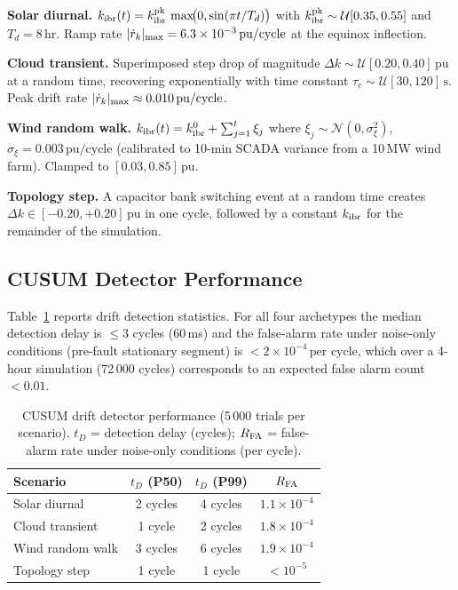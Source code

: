 \documentclass[journal]{IEEEtran}
\newcommand{\kibr}{k_{\rm ibr}}
\newcommand{\rdot}{\dot{r}_k}
\begin{document}
\textbf{Solar diurnal.}
$\kibr(t) = \kibr^{\rm pk}\,\max\!\bigl(0,\sin(\pi t/T_d)\bigr)$ with
$\kibr^{\rm pk} \sim \mathcal{U}[0.35, 0.55]$ and $T_d = 8\,\text{hr}$.
Ramp rate $|\rdot|_{\rm max} = 6.3\times10^{-3}\,\text{pu/cycle}$
at the equinox inflection.

\textbf{Cloud transient.}
Superimposed step drop of magnitude
$\Delta k \sim \mathcal{U}[0.20, 0.40]\,\text{pu}$ at a random time,
recovering exponentially with time constant $\tau_c \sim
\mathcal{U}[30, 120]\,\text{s}$.
Peak drift rate $|\rdot|_{\rm max} \approx 0.010\,\text{pu/cycle}$.

\textbf{Wind random walk.}
$\kibr(t) = \kibr^0 + \sum_{j=1}^{t} \xi_j$ where $\xi_j \sim
\mathcal{N}(0, \sigma_\xi^2)$, $\sigma_\xi = 0.003\,\text{pu/cycle}$
(calibrated to 10-min SCADA variance from a 10\,MW wind farm).
Clamped to $[0.03, 0.85]\,\text{pu}$.

\textbf{Topology step.}
A capacitor bank switching event at a random time creates
$\Delta k \in [-0.20, +0.20]\,\text{pu}$ in one cycle, followed by a
constant $\kibr$ for the remainder of the simulation.

\subsection{CUSUM Detector Performance}

Table~\ref{tab:cusum} reports drift detection statistics.  For all
four archetypes the median detection delay is $\leq 3$ cycles (60\,ms)
and the false-alarm rate under noise-only conditions (pre-fault
stationary segment) is $< 2\times10^{-4}\,\text{per cycle}$, which
over a 4-hour simulation (72\,000 cycles) corresponds to an expected
false alarm count $< 0.01$.

\begin{table}[htbp]
  \centering
  \caption{CUSUM drift detector performance (5\,000 trials per scenario).
  $t_D$ = detection delay (cycles); $R_{\rm FA}$ = false-alarm rate
  under noise-only conditions (per cycle).}
  \label{tab:cusum}
  \small
  \begin{tabular}{@{}lccc@{}}
    \toprule
    Scenario & $t_D$ (P50) & $t_D$ (P99) & $R_{\rm FA}$ \\
    \midrule
    Solar diurnal   & 2 cycles & 4 cycles & $1.1\!\times\!10^{-4}$ \\
    Cloud transient & 1 cycle  & 2 cycles & $1.8\!\times\!10^{-4}$ \\
    Wind random walk & 3 cycles & 6 cycles & $1.9\!\times\!10^{-4}$ \\
    Topology step   & 1 cycle  & 1 cycle  & $< 10^{-5}$ \\
    \bottomrule
  \end{tabular}
\end{table}
\end{document}
